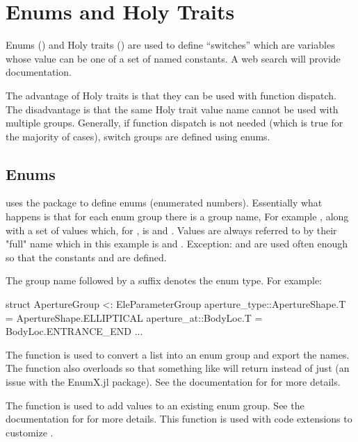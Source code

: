\chapter{Enums and Holy Traits}
\label{c:enums}

Enums () and Holy traits () are used to define ``switches'' which are
variables whose value can be one of a set of named constants. 
A web search will provide documentation. 

The advantage of Holy traits is that they can be used with function dispatch. The disadvantage is
that the same Holy trait value name cannot be used with multiple groups. Generally, if function
dispatch is not needed (which is true for the majority of cases), switch groups are defined using enums.

\section{Enums}
\label{s:enums}

\accellat uses the package  to define enums (enumerated numbers).
Essentially what happens is that for each enum group there is a group name, For example ,
along with a set of values which, for , is  and . Values
are always referred to by their "full" name which in this example is  and
. Exception:  and  are
used often enough so that the constants  and  are defined.

The group name followed by a  suffix denotes the enum type.
For example:
\begin{example}
  struct ApertureGroup <: EleParameterGroup
    aperture_type::ApertureShape.T = ApertureShape.ELLIPTICAL
    aperture_at::BodyLoc.T = BodyLoc.ENTRANCE_END
    ...
\end{example}

The  function is used to convert a list into an enum group and export the names.
The  function also overloads  so that something like  
will return  instead of just  (an issue with the EnumX.jl package). 
See the documentation for  for more details.

The  function is used to add values to an existing enum group. See the documentation for
 for more details. This function is used with code extensions to customize \accellat.

